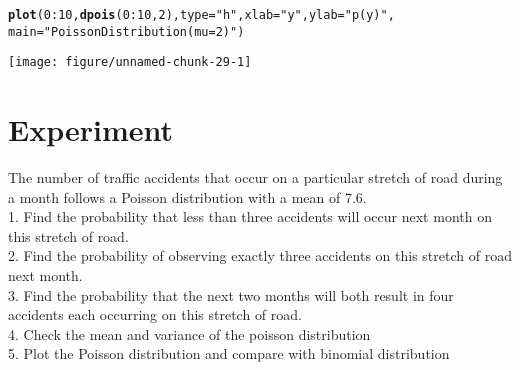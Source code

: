 \documentclass{article}\usepackage[]{graphicx}\usepackage[]{xcolor}
\makeatletter
\def\maxwidth{ %
  \ifdim\Gin@nat@width>\linewidth
    \linewidth
  \else
    \Gin@nat@width
  \fi
}
\newcommand{\hlnum}[1]{\textcolor[rgb]{0.686,0.059,0.569}{#1}}%
\newcommand{\hlsng}[1]{\textcolor[rgb]{0.192,0.494,0.8}{#1}}%
\newcommand{\hlopt}[1]{\textcolor[rgb]{0,0,0}{#1}}%
\newcommand{\hldef}[1]{\textcolor[rgb]{0.345,0.345,0.345}{#1}}%
\newcommand{\hlkwc}[1]{\textcolor[rgb]{0.333,0.667,0.333}{#1}}%
\newcommand{\hlkwd}[1]{\textcolor[rgb]{0.737,0.353,0.396}{\textbf{#1}}}%
\newenvironment{kframe}{%
 \def\at@end@of@kframe{}%
 \ifinner\ifhmode%
  \def\at@end@of@kframe{\end{minipage}}%
  \begin{minipage}{\columnwidth}%
 \fi\fi%
 \def\FrameCommand##1{\hskip\@totalleftmargin \hskip-\fboxsep
 \colorbox{shadecolor}{##1}\hskip-\fboxsep
     \hskip-\linewidth \hskip-\@totalleftmargin \hskip\columnwidth}%
 \MakeFramed {\advance\hsize-\width
   \@totalleftmargin\z@ \linewidth\hsize
   \@setminipage}}%
 {\par\unskip\endMakeFramed%
 \at@end@of@kframe}
\newenvironment{knitrout}{}{} %
\makeatother
\begin{document}
\begin{knitrout}
\color{fgcolor}\begin{kframe}
\begin{alltt}
\hlkwd{plot}\hldef{(}\hlnum{0}\hlopt{:}\hlnum{10}\hldef{,}\hlkwd{dpois}\hldef{(}\hlnum{0}\hlopt{:}\hlnum{10}\hldef{,}\hlnum{2}\hldef{),}\hlkwc{type}\hldef{=}\hlsng{"h"}\hldef{,}\hlkwc{xlab}\hldef{=}\hlsng{"y"}\hldef{,}\hlkwc{ylab}\hldef{=}\hlsng{"p(y)"}\hldef{,}
\hlkwc{main}\hldef{=}\hlsng{"Poisson Distribution (mu=2)"}\hldef{)}
\end{alltt}
\end{kframe}
\texttt{[image: figure/unnamed-chunk-29-1]} 
\end{knitrout}
\section*{Experiment}
The number of traffic accidents that occur on a particular stretch of road during a month follows a
Poisson distribution with a mean of 7.6.\\
1. Find the probability that less than three accidents will occur next month on
this stretch of road.\\
2. Find the probability of observing exactly three accidents on this stretch of
road next month.\\
3. Find the probability that the next two months will both result in four
accidents each occurring on this stretch of road.\\
4. Check the mean and variance of the poisson distribution\\
5. Plot the Poisson distribution and compare with binomial distribution
\end{document}
